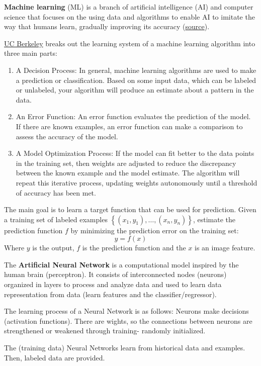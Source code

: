 \begin{deepeningbox}
    \textbf{Machine learning} (ML) is a branch of artificial intelligence (AI) and computer science that focuses on the using data and algorithms to enable AI to imitate the way that humans learn, gradually improving its accuracy (\href{https://www.ibm.com/topics/machine-learning}{source}).

    \highspace
    \href{https://ischoolonline.berkeley.edu/blog/what-is-machine-learning/}{UC Berkeley} breaks out the learning system of a machine learning algorithm into three main parts:
    \begin{enumerate}
        \item A Decision Process: In general, machine learning algorithms are used to make a prediction or classification. Based on some input data, which can be labeled or unlabeled, your algorithm will produce an estimate about a pattern in the data.

        \item An Error Function: An error function evaluates the prediction of the model. If there are known examples, an error function can make a comparison to assess the accuracy of the model.

        \item A Model Optimization Process: If the model can fit better to the data points in the training set, then weights are adjusted to reduce the discrepancy between the known example and the model estimate. The algorithm will repeat this iterative  process, updating weights autonomously until a threshold of accuracy has been met.
    \end{enumerate}

    \highspace
    The main goal is to learn a target function that can be used for prediction. Given a training set of labeled examples $\left\{\left(x_{1}, y_{1}\right), \dots, \left(x_{n}, y_{n}\right)\right\}$, estimate the prediction function $f$ by minimizing the prediction error on the training set:
    \begin{equation*}
        y = f\left(x\right)
    \end{equation*}
    Where $y$ is the output, $f$ is the prediction function and the $x$ is an image feature.
\end{deepeningbox}

\begin{deepeningbox}
    The \textbf{Artificial Neural Network} is a computational model inspired by the human brain (perceptron). It consists of interconnected nodes (neurons) organized in layers to process and analyze data and used to learn data representation from data (learn features and the classifier/regressor).

    \highspace
    The learning process of a Neural Network is as follows: Neurons make decisions (activation functions). There are wights, so the connections between neurons are strengthened or weakened through training- randomly initialized.

    The (training data) Neural Networks learn from historical data and examples. Then, labeled data are provided.
\end{deepeningbox}

